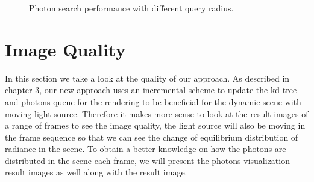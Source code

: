 \begin{figure}[ftp]
    \centering
    \renewcommand{\thefigure}{\thechapter.\arabic{figure}}
    \caption[Photon search performance with different query radius]{Photon search performance with different query radius. }
    \label{fig:photon_search_2}
\end{figure}

\section{Image Quality}

In this section we take a look at the quality of our approach. As described in chapter 3, our new approach uses an incremental scheme to update the kd-tree and photons queue for the rendering to be beneficial for the dynamic scene with moving light source. Therefore it makes more sense to look at the result images of a range of frames to see the image quality, the light source will also be moving in the frame sequence so that we can see the change of equilibrium distribution of radiance in the scene. To obtain a better knowledge on how the photons are distributed in the scene each frame, we will present the photons visualization result images as well along with the result image.

